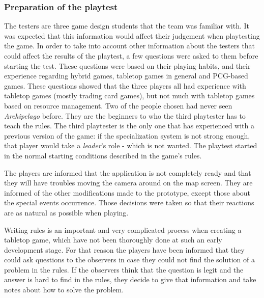 \subsubsection{Preparation of the playtest}

The testers are three game design students that the team was familiar with. It was expected that this information would affect their judgement when playtesting the game. In order to take into account other information about the testers that could affect the results of the playtest, a few questions were asked to them before starting the test. These questions were based on their playing habits, and their experience regarding hybrid games, tabletop games in general and PCG-based games. These questions showed that the three players all had experience with tabletop games (mostly trading card games), but not much with tabletop games based on resource management. Two of the people chosen had never seen \textit{Archipelago} before. They are the beginners to who the third playtester has to teach the rules. The third playtester is the only one that has experienced with a previous version of the game: if the specialization system is not strong enough, that player would take a \textit{leader}'s role - which is not wanted. The playtest started in the normal starting conditions described in the game's rules.

The players are informed that the application is not completely ready and that they will have troubles moving the camera around on the map screen. They are informed of the other modifications made to the prototype, except those about the special events occurrence. Those decisions were taken so that their reactions are as natural as possible when playing.

Writing rules is an important and very complicated process when creating a tabletop game, which have not been thoroughly done at such an early development stage. For that reason the players have been informed that they could ask questions to the observers in case they could not find the solution of a problem in the rules. If the observers think that the question is legit and the answer is hard to find in the rules, they decide to give that information and take notes about how to solve the problem. 


